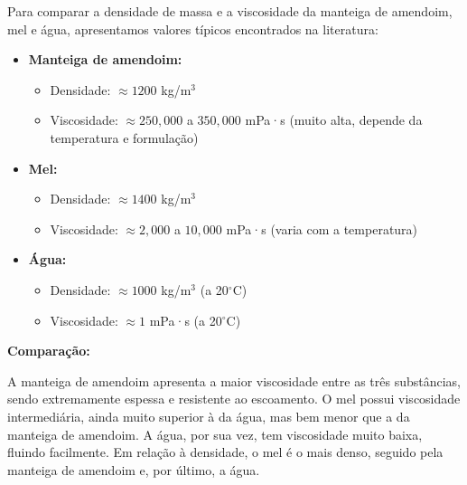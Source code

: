 
Para comparar a densidade de massa e a viscosidade da manteiga de amendoim, mel e água, apresentamos valores típicos encontrados na literatura:

\begin{itemize}
	\item \textbf{Manteiga de amendoim:}
	\begin{itemize}
		\item Densidade: $\approx 1200$ kg/m$^3$
		\item Viscosidade: $\approx 250{,}000$ a $350{,}000$ mPa·s (muito alta, depende da temperatura e formulação)
	\end{itemize}
	\item \textbf{Mel:}
	\begin{itemize}
		\item Densidade: $\approx 1400$ kg/m$^3$
		\item Viscosidade: $\approx 2{,}000$ a $10{,}000$ mPa·s (varia com a temperatura)
	\end{itemize}
	\item \textbf{Água:}
	\begin{itemize}
		\item Densidade: $\approx 1000$ kg/m$^3$ (a 20$^\circ$C)
		\item Viscosidade: $\approx 1$ mPa·s (a 20$^\circ$C)
	\end{itemize}
\end{itemize}

\textbf{Comparação:}

A manteiga de amendoim apresenta a maior viscosidade entre as três substâncias, sendo extremamente espessa e resistente ao escoamento. O mel possui viscosidade intermediária, ainda muito superior à da água, mas bem menor que a da manteiga de amendoim. A água, por sua vez, tem viscosidade muito baixa, fluindo facilmente. Em relação à densidade, o mel é o mais denso, seguido pela manteiga de amendoim e, por último, a água.
